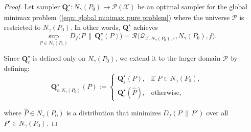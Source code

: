 \documentclass[accepted]{article}
\theoremstyle{plain} %
\theoremstyle{definition}
\theoremstyle{remark}
\newcommand{\eps}{\varepsilon}
\newcommand{\bQ}{\mathbf{Q}}
\newcommand{\ngb}{N_\gamma(P_0)}
\begin{document}
\begin{proof}



Let sampler \(\bQ^\star_\eps: \ngb \to \mathcal{P}(\mathcal{X})\) be an optimal sampler for the global minimax problem (\ref{eqn: global minimax pure problem}) where the universe $\mathcal{\tilde{P}}$ is restricted to \(N_\gamma(P_0)\). 
In other words, $\bQ^\star_\eps$ achieves
\[
\sup_{P \in N_\gamma(P_0)} D_f\big(P \, \| \, \bQ^\star_\eps(P)\big)
= \mathcal{R}\Big(\mathcal{Q}_{\mathcal{X}, N_\gamma(P_0), \eps}, N_\gamma(P_0), f\Big).
\]

Since \(\bQ^\star_\eps\) is defined only on \(N_\gamma(P_0)\), we extend it to the larger domain 
\(\tilde{\mathcal{P}}\) by defining:
\begin{equation}\label{eqn: local pure optimal mech}
    \bQ^\star_{\eps, N_\gamma(P_0)}(P) := 
\begin{cases}
\bQ^\star_\eps(P), & \text{if } P \in N_\gamma(P_0), \\[6pt]
\bQ^\star_\eps(\hat{P}), & \text{otherwise},
\end{cases}    
\end{equation}


where \( \hat{P} \in N_\gamma(P_0) \) is a distribution that minimizes \(  D_f(P \,\|\, P') \) over all $P' \in N_\gamma(P_0)$.


\end{proof}
\end{document}
